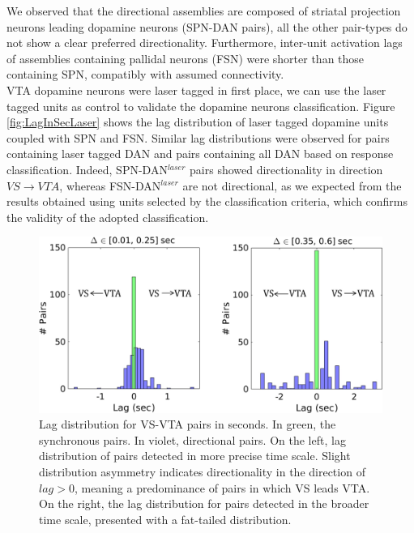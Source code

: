 We observed that the directional assemblies are composed of striatal projection neurons leading dopamine neurons (SPN-DAN pairs), all the other pair-types do not show a clear preferred directionality. Furthermore, inter-unit activation lags of assemblies containing pallidal neurons (FSN) were shorter than those containing SPN, compatibly with assumed connectivity.\\
VTA dopamine neurons were laser tagged in first place, we can use the laser tagged units as control to validate the dopamine neurons classification. Figure \ref{fig:LagInSecLaser} shows the lag distribution of laser tagged dopamine units coupled with SPN and FSN. Similar lag distributions were observed for pairs containing laser tagged DAN and pairs containing all DAN based on response classification. Indeed, SPN-DAN$^{laser}$ pairs showed directionality in direction $VS\rightarrow VTA$, whereas FSN-DAN$^{laser}$ are not directional, as we expected from the results obtained using units selected by the classification criteria, which confirms the validity of the adopted classification.\\
\begin{figure}[H]
\centering
\includegraphics[scale=0.58]{figures/LagGeneral1.pdf}
\caption{Lag distribution for VS-VTA pairs in seconds. In green, the synchronous pairs. In violet, directional pairs. On the left, lag distribution of pairs detected in more precise time scale. Slight distribution asymmetry indicates directionality in the direction of $lag > 0$, meaning a predominance of pairs in which VS leads VTA. On the right, the lag distribution for pairs detected in the broader time scale, presented with a fat-tailed distribution.}
\label{fig:LagInSecAll}
\end{figure}
